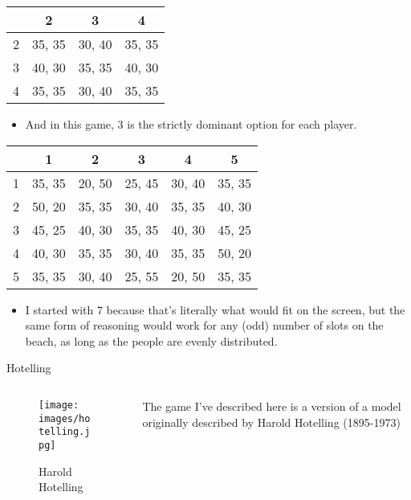\documentclass[
  ignorenonframetext,
]{beamer}
\providecommand{\tightlist}{%
  \setlength{\itemsep}{0pt}\setlength{\parskip}{0pt}}
\begin{document}
\begin{frame}
\begin{table}[!h]
\centering
\begin{tabular}[t]{>{}r|ccc}
\toprule
 & 2 & 3 & 4\\
\midrule
2 & 35, 35 & 30, 40 & 35, 35\\
3 & 40, 30 & 35, 35 & 40, 30\\
4 & 35, 35 & 30, 40 & 35, 35\\
\bottomrule
\end{tabular}
\end{table}

\begin{itemize}
\tightlist
\item
  And in this game, 3 is the strictly dominant option for each player.
\end{itemize}
\end{frame}

\begin{frame}
\begin{table}[!h]
\centering
\begin{tabular}[t]{>{}r|ccccc}
\toprule
 & 1 & 2 & 3 & 4 & 5\\
\midrule
1 & 35, 35 & 20, 50 & 25, 45 & 30, 40 & 35, 35\\
2 & 50, 20 & 35, 35 & 30, 40 & 35, 35 & 40, 30\\
3 & 45, 25 & 40, 30 & 35, 35 & 40, 30 & 45, 25\\
4 & 40, 30 & 35, 35 & 30, 40 & 35, 35 & 50, 20\\
5 & 35, 35 & 30, 40 & 25, 55 & 20, 50 & 35, 35\\
\bottomrule
\end{tabular}
\end{table}

\begin{itemize}
\tightlist
\item
  I started with 7 because that's literally what would fit on the
  screen, but the same form of reasoning would work for any (odd) number
  of slots on the beach, as long as the people are evenly distributed.
\end{itemize}
\end{frame}

\begin{frame}{Hotelling}
\protect\hypertarget{hotelling}{}
\begin{columns}[c]
\begin{column}{0.48\textwidth}
\begin{figure}
\centering
\texttt{[image: images/hotelling.jpg]}
\caption{Harold Hotelling}
\end{figure}
\end{column}

\begin{column}{0.48\textwidth}
The game I've described here is a version of a model originally
described by Harold Hotelling (1895-1973)
\end{column}
\end{columns}
\end{frame}
\end{document}
